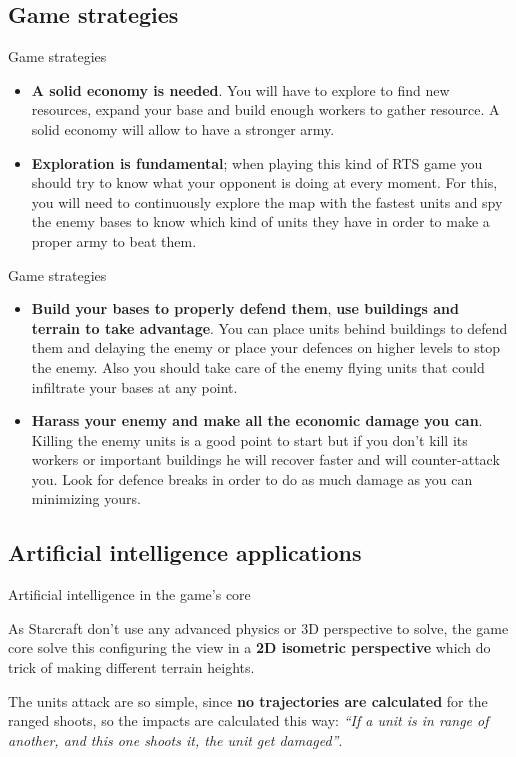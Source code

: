 \documentclass[10pt]{beamer}
\begin{document}
\subsection{Game strategies}


\begin{frame}{Game strategies}
     \begin{itemize}
     \item \textbf{A solid economy is needed}. You will have to explore to find new resources, expand your base and build enough workers to gather resource. A solid economy will allow to have a stronger army.\newline
     \item \textbf{Exploration is fundamental}; when playing this kind of RTS game you should try to know what your opponent is doing at every moment. For this, you will need to continuously explore the map with the fastest units and spy the enemy bases to know which kind of units they have in order to make a proper army to beat them.
\end{itemize}
\end{frame}
\begin{frame}{Game strategies}
\begin{itemize}
     \item \textbf{Build your bases to properly defend them}, \textbf{use buildings and terrain to take advantage}. You can place units behind buildings to defend them and delaying the enemy or place your defences on higher levels to stop the enemy. Also you should take care of the enemy flying units that could infiltrate your bases at any point.\newline
     \item \textbf{Harass your enemy and make all the economic damage you can}. Killing the enemy units is a good point to start but if you don't kill its workers or important buildings he will recover faster and will counter-attack you. Look for defence breaks in order to do as much damage as you can minimizing yours.
    \end{itemize}
\end{frame}

\subsection{Artificial intelligence applications}

\begin{frame}{Artificial intelligence in the game's core}


As Starcraft don't use any advanced physics or 3D perspective to solve, the game core solve this configuring the view in a \textbf{2D isometric perspective} which do trick of making different terrain heights. \newline

The units attack are so simple, since \textbf{no trajectories are calculated} for the ranged shoots, so the impacts are calculated this way: \textit{``If a unit is in range of another, and this one shoots it, the unit get damaged''}.
\end{frame}
\end{document}
